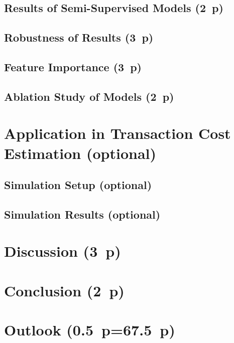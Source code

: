 \subsection{Results of Semi-Supervised
  Models (2~p)}\label{sec:results-of-semi-supervised-models}

\subsection{Robustness of Results (3~p)}\label{sec:robustness-checks}

\subsection{Feature Importance (3~p)}\label{sec:feature-importance}

\subsection{Ablation Study of Models (2~p)}\label{sec:ablation-study}

\newpage
\section{Application in Transaction Cost Estimation (optional)}\label{sec:application}
\subsection{Simulation Setup (optional)}\label{sec:simulation-setup}
\subsection{Simulation Results (optional)}\label{sec:simulation-results}

\newpage
\section{Discussion (3~p)}\label{sec:discussion}

\newpage
\section{Conclusion (2~p)}\label{sec:conclusion}

\newpage
\section{Outlook (0.5~p=67.5~p)}\label{sec:outlook}


